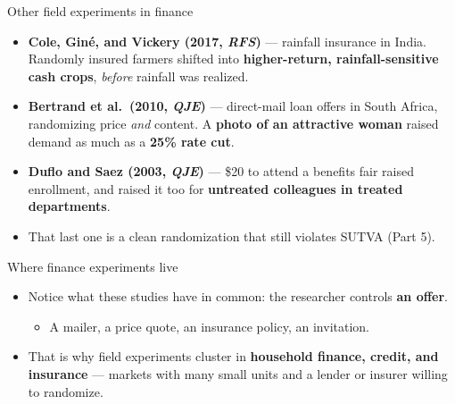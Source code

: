 \documentclass[
  11pt,
  ignorenonframetext,
  aspectratio=169,
]{beamer}
\providecommand{\tightlist}{%
  \setlength{\itemsep}{0pt}\setlength{\parskip}{0pt}}
\begin{document}
\begin{frame}{Other field experiments in finance}
\protect{}\label{other-field-experiments-in-finance}
\begin{itemize}
\tightlist
\item
  \textbf{Cole, Giné, and Vickery (2017, \emph{RFS})} --- rainfall
  insurance in India. Randomly insured farmers shifted into
  \textbf{higher-return, rainfall-sensitive cash crops}, \emph{before}
  rainfall was realized.
\item
  \textbf{Bertrand et al.~(2010, \emph{QJE})} --- direct-mail loan
  offers in South Africa, randomizing price \emph{and} content. A
  \textbf{photo of an attractive woman} raised demand as much as a
  \textbf{25\% rate cut}.
\item
  \textbf{Duflo and Saez (2003, \emph{QJE})} --- \$20 to attend a
  benefits fair raised enrollment, and raised it too for
  \textbf{untreated colleagues in treated departments}.
\item
  That last one is a clean randomization that still violates SUTVA (Part
  5).
\end{itemize}
\end{frame}

\begin{frame}{Where finance experiments live}
\protect{}\label{where-finance-experiments-live}
\begin{itemize}
\tightlist
\item
  Notice what these studies have in common: the researcher controls
  \textbf{an offer}.

  \begin{itemize}
  \tightlist
  \item
    A mailer, a price quote, an insurance policy, an invitation.
  \end{itemize}
\item
  That is why field experiments cluster in \textbf{household finance,
  credit, and insurance} --- markets with many small units and a lender
  or insurer willing to randomize.
\end{itemize}
\end{frame}
\end{document}
